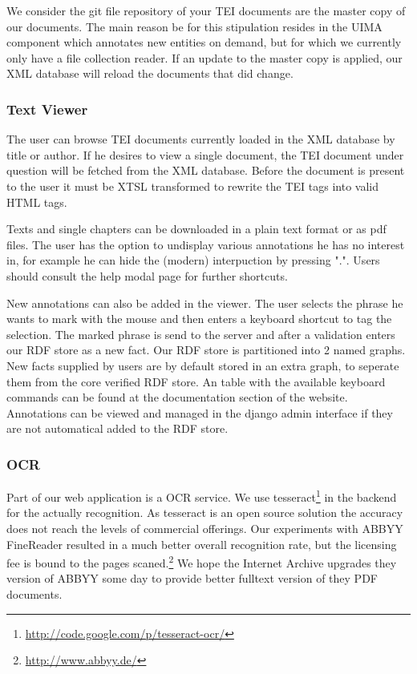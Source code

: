 \documentclass[12pt, draft]{article}
\begin{document}
We consider the git file repository of your TEI documents are the master copy
of our documents.  The main reason be for this stipulation resides in the
UIMA component which annotates new entities on demand, but for which we
currently only have a file collection reader.  If an update to the master copy
is applied, our XML database will reload the documents that did change.

\subsubsection{Text Viewer}

The user can browse TEI documents currently loaded in the XML database by title
or author.  If he desires to view a single document, the TEI document under question
will be fetched from the XML database.  Before the document is present to the
user it must be XTSL transformed to rewrite the TEI tags into valid HTML
tags.

Texts and single chapters can be downloaded in a plain text format or as pdf files.
The user has the option to undisplay various annotations he has no interest in, for example
he can hide the (modern) interpuction by pressing ".".  Users should consult the
help modal page for further shortcuts.

New annotations can also be added in the viewer. The user selects the phrase he wants
to mark with the mouse and then enters a keyboard shortcut to tag the selection.
The marked phrase is send to the server and after a validation enters
our RDF store as a new fact.  Our RDF store is partitioned into 2 named graphs.
New facts supplied by users are by default stored in an extra graph, to seperate them
from the core verified RDF store.  An table with the available keyboard commands
can be found at the documentation section of the website.
Annotations can be viewed and managed in the django admin interface if they are not
automatical added to the RDF store.

\subsubsection{OCR}

Part of our web application is a OCR service.  We use tesseract\footnote{\url{http://code.google.com/p/tesseract-ocr/}}
 in the backend for the
actually recognition.  As tesseract is an open source solution the accuracy does not
reach the levels of commercial offerings.  Our experiments with ABBYY FineReader
resulted in a much better overall recognition rate, but the licensing fee is bound
to the pages scaned.\footnote{\url{http://www.abbyy.de/}}
We hope the Internet Archive upgrades they version of ABBYY some day to provide better fulltext
version of they PDF documents.
\end{document}
